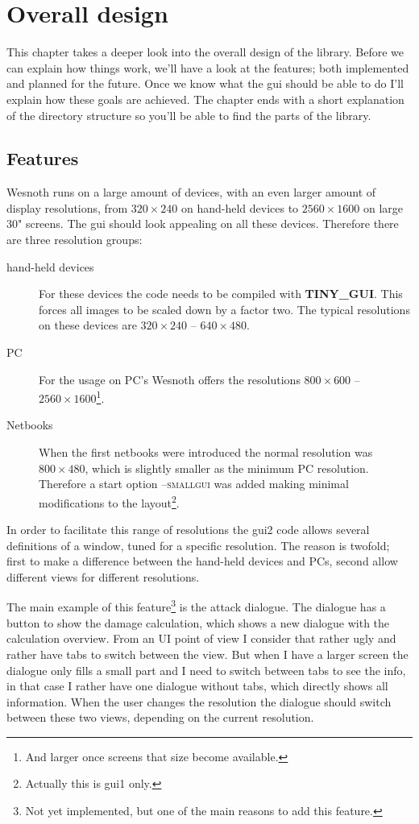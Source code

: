 \chapter{Overall design}

This chapter takes a deeper look into the overall design of the library. Before
we can explain how things work, we'll have a look at the features; both
implemented and planned for the future. Once we know what the gui should be able
to do I'll explain how these goals are achieved. The chapter ends with a short
explanation of the directory structure so you'll be able to find the parts of
the library.

\section{Features}

Wesnoth runs on a large amount of devices, with an even larger amount of display
resolutions, from $320\times 240$ on hand-held devices to $2560\times 1600$ on
large 30" screens. The gui should look appealing on all these devices. Therefore
there are three resolution groups:
\begin{description}
\item[hand-held devices] For these devices the code needs to be compiled with
\textbf{TINY\_GUI}. This forces all images to be scaled down by a factor two.
	The typical resolutions on these devices are $320\times 240$ -- $640\times
	480$.
\item[PC] For the usage on PC's Wesnoth offers the resolutions $800\times 600$
	-- $2560\times 1600$\footnote{And larger once screens that size become
	available.}.
\item[Netbooks] When the first netbooks were introduced the normal resolution
	was $800\times 480$, which is slightly smaller as the minimum PC resolution.
	Therefore a start option \textsc{--smallgui} was added making minimal
	modifications to the layout\footnote{Actually this is gui1 only.}.
\end{description}

In order to facilitate this range of resolutions the gui2 code allows several
definitions of a window, tuned for a specific resolution. The reason is twofold;
first to make a difference between the hand-held devices and PCs, second allow
different views for different resolutions.

The main example of this feature\footnote{Not yet implemented, but one of the
main reasons to add this feature.} is the attack dialogue. The dialogue has a
button to show the damage calculation, which shows a new dialogue with the
calculation overview. From an UI point of view I consider that rather ugly and
rather have tabs to switch between the view. But when I have a larger screen the
dialogue only fills a small part and I need to switch between tabs to see the
info, in that case I rather have one dialogue without tabs, which directly shows
all information. When the user changes the resolution the dialogue should switch
between these two views, depending on the current resolution.

